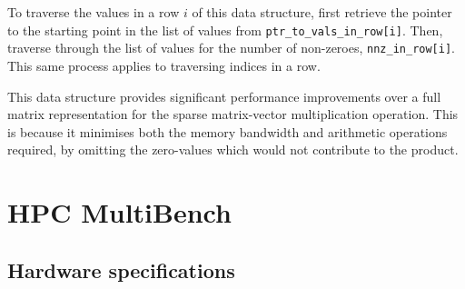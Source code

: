 To traverse the values in a row $i$ of this data structure, first retrieve the pointer to the starting point in the list of values from \texttt{ptr\_to\_vals\_in\_row[i]}. Then, traverse through the list of values for the number of non-zeroes, \texttt{nnz\_in\_row[i]}. This same process applies to traversing indices in a row.

This data structure provides significant performance improvements over a full matrix representation for the sparse matrix-vector multiplication operation. This is because it minimises both the memory bandwidth and arithmetic operations required, by omitting the zero-values which would not contribute to the product.









\chapter{HPC MultiBench}
\label{ch:tooling-appendix}

\section{Hardware specifications}
\label{sec:tooling-replication-yaml}

